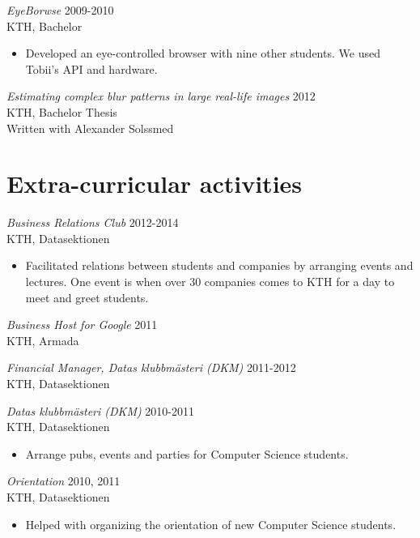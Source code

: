 \documentclass[margin, 10pt]{res} %
\begin{document}
\begin{resume}
{\sl EyeBorwse} \hfill 2009-2010 \\
KTH, Bachelor
\begin{itemize} 
\item Developed an eye-controlled browser with nine other students. We used Tobii’s API and hardware.
\end{itemize} 

{\sl Estimating complex blur patterns in large real-life images} \hfill 2012 \\
KTH, Bachelor Thesis \\
Written with Alexander Solssmed



\section{Extra-curricular activities}

{\sl Business Relations Club} \hfill 2012-2014 \\
KTH, Datasektionen
\begin{itemize} 
\item Facilitated relations between students and companies by arranging events and lectures. One event is when over 30 companies comes to KTH for a day to meet and greet students.
\end{itemize}

{\sl Business Host for Google} \hfill 2011 \\
KTH, Armada

{\sl Financial Manager, Datas klubbmästeri (DKM)} \hfill 2011-2012 \\
KTH, Datasektionen

{\sl Datas klubbmästeri (DKM)} \hfill 2010-2011 \\
KTH, Datasektionen
\begin{itemize} 
\item Arrange pubs, events and parties for Computer Science students.
\end{itemize}

{\sl Orientation} \hfill 2010, 2011 \\
KTH, Datasektionen
\begin{itemize} 
\item Helped with organizing the orientation of new Computer Science students.
\end{itemize}


\end{resume}
\end{document}
